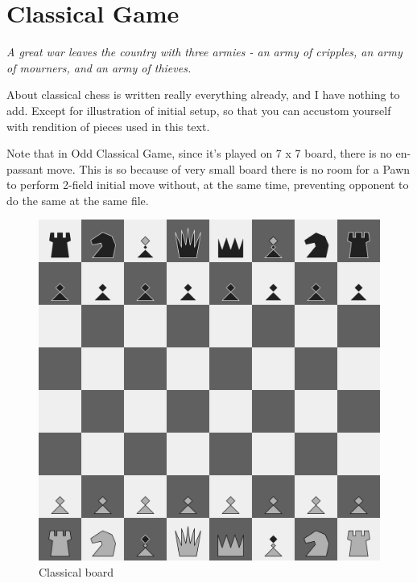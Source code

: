 \documentclass[a5paper,12pt,draft]{book} %
\begin{document}
\chapter*{Classical Game}

\begin{flushright}
\parbox{0.8\textwidth}{
\emph{A great war leaves the country with three armies -
an army of cripples, an army of mourners, and an army of thieves. \\
 } }
\end{flushright}

About classical chess is written really everything already, and I
have nothing to add. Except for illustration of initial setup, so that
you can accustom yourself with rendition of pieces used in this text.

Note that in Odd Classical Game, since it's played on 7 x 7 board,
there is no en-passant move. This is so because of very small board
there is no room for a Pawn to perform 2-field initial move without,
at the same time, preventing opponent to do the same at the same file.

\noindent
\begin{figure}[t]
\includegraphics[width=1.0\textwidth, keepaspectratio=true]{../gfx/boards/02_classical.png}
\caption{Classical board}
\label{fig:classical_chess}
\end{figure}
\end{document}
